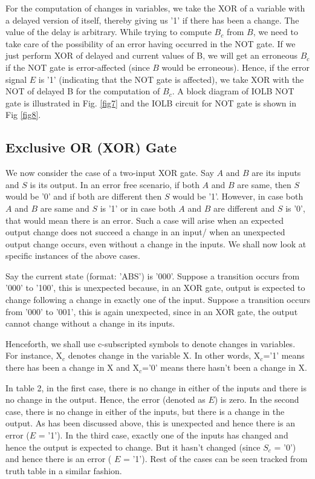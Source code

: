 \documentclass[10pt,journal,cspaper,compsoc]{IEEEtran}
\begin{document}
       For the computation of changes in variables, we take the XOR of a variable with a delayed version of itself, thereby giving us '1' if there has been a change. The value of the delay is arbitrary. While trying to compute $B_{c}$ from $B$, we need to take care of the possibility of an error having occurred in the NOT gate. If we just perform XOR of delayed and current values of B, we will get an erroneous $B_{c}$ if the NOT gate is error-affected (since $B$ would be erroneous). Hence, if the error signal $E$ is '1' (indicating that the NOT gate is affected), we take XOR with the NOT of delayed B for the computation of $B_{c}$. A block diagram of  IOLB NOT gate is illustrated in Fig. \ref{fig7} and the IOLB circuit for NOT gate is shown in Fig \ref{fig8}.
\subsection{Exclusive OR (XOR) Gate}
We now consider the case of a two-input XOR gate. Say $A$ and $B$ are its inputs and $S$ is its output. In an error free scenario, if both $A$ and $B$ are same, then $S$ would be '0' and if both are different then $S$ would be '1'. However, in case both $A$ and $B$ are same and $S$ is '1' or in case both $A$ and $B$ are different and $S$ is '0', that would mean there is an error. Such a case will arise when an expected output change does not succeed a change in an input/ when an unexpected output change occurs, even without a change in the inputs. We shall now look at specific instances of the above cases.

Say the current state (format: 'ABS') is '000'. Suppose a transition occurs from '000' to '100', this is unexpected because, in an XOR gate, output is expected to change following a change in exactly one of the input. Suppose a transition occurs from '000' to '001', this is again unexpected, since in an XOR gate, the output cannot change without a change in its inputs.

Henceforth, we shall use c-subscripted symbols to denote changes in variables. For instance, X$_c$ denotes change in the variable X. In other words, X$_c$='1' means there has been a change in X and X$_c$='0' means there hasn't been a change in X.

In table 2, in the first case, there is no change in either of the inputs and there is no change in the output. Hence, the error (denoted as $E$) is zero. In the second case, there is no change in either of the inputs, but there is a change in the output. As has been discussed above, this is unexpected and hence there is an error ($E$ = '1'). In the third case, exactly one of the inputs has changed and hence the output is expected to change. But it hasn't changed (since $S_c$ = '0') and hence there is an error ( $E$ = '1'). Rest of the cases can be seen tracked from truth table in a similar fashion.
\end{document}
